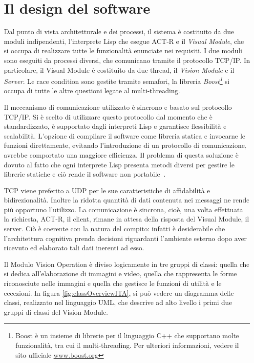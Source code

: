			

	\section*{Il design del software}

		Dal punto di vista architetturale e dei processi, il sistema è costituito da due moduli indipendenti, l'interprete Lisp che esegue \mbox{ACT-R} e il \emph{Visual Module}, che si occupa di realizzare tutte le funzionalità enunciate nei requisiti.
		I due moduli sono eseguiti da processi diversi, che comunicano tramite il protocollo \mbox{TCP/IP}.
		In particolare, il Visual Module è costituito da due thread, il \emph{Vision Module} e il \emph{Server}.
		Le race condition sono gestite tramite semafori, la libreria \emph{Boost\footnote{Boost è un insieme di librerie per il linguaggio C++ che supportano molte funzionalità, tra cui il multi-threading. Per ulteriori informazioni, vedere il sito ufficiale \url{www.boost.org}}} si occupa di tutte le altre questioni legate al multi-threading.
		
		Il meccanismo di comunicazione utilizzato è sincrono e basato sul protocollo \mbox{TCP/IP}.
		Si è scelto di utilizzare questo protocollo dal momento che è standardizzato, è supportato dagli interpreti Lisp e garantisce flessibilità e scalabilità.
		L'opzione di compilare il software come libreria statica e invocarne le funzioni direttamente, evitando l'introduzione di un protocollo di comunicazione, avrebbe comportato una maggiore efficienza.
		Il problema di questa soluzione è dovuto al fatto che ogni interprete Lisp presenta metodi diversi per gestire le librerie statiche e ciò rende il software non portabile~\cite{SWIGDoc}.

		TCP viene preferito a UDP per le sue caratteristiche di affidabilità e bidirezionalità.
		Inoltre la ridotta quantità di dati contenuta nei messaggi ne rende più opportuno l'utilizzo.
		La comunicazione è sincrona, cioè, una volta effettuata la richiesta, \mbox{ACT-R}, il client, rimane in attesa della risposta del Visual Module, il server. 
		Ciò è coerente con la natura del compito: infatti è desiderabile che l'architettura cognitiva prenda decisioni riguardanti l'ambiente esterno dopo aver ricevuto ed elaborato tali dati inerenti ad esso.

		Il Modulo Vision Operation è diviso logicamente in tre gruppi di classi: quella che si dedica all'elaborazione di immagini e video, quella che rappresenta le forme riconosciute nelle immagini e quella che gestisce le funzioni di utilità e le eccezioni.
		In figura \ref{fig:classOverviewITA}, si può vedere un diagramma delle classi, realizzato nel linguaggio UML, che descrive ad alto livello i primi due gruppi di classi del Vision Module.
	
